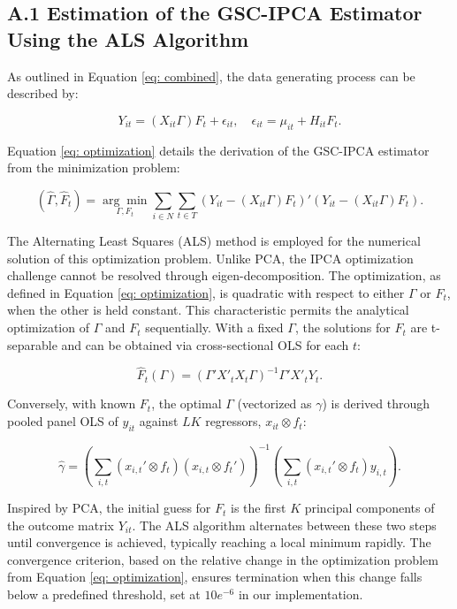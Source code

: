 \documentclass[12pt]{article}
\begin{document}
\subsection*{A.1 Estimation of the GSC-IPCA Estimator Using the ALS Algorithm}

As outlined in Equation \ref{eq: combined}, the data generating process can be described by:

\begin{equation*}
Y_{it} = (X_{it}\Gamma) F_{t} + \epsilon_{it}, \quad \epsilon_{it} = \mu_{it} + H_{it} F_t.
\end{equation*}

Equation \ref{eq: optimization} details the derivation of the GSC-IPCA estimator from the minimization problem:

\begin{equation*}
(\hat{\Gamma}, \hat{F}_t) = \underset{\Gamma, F_t}{\arg\min} \sum_{i \in N} \sum_{t \in T} \left( Y_{it} - (X_{it}\Gamma) F_{t} \right)' \left( Y_{it} - (X_{it}\Gamma) F_{t} \right).
\end{equation*}

The Alternating Least Squares (ALS) method is employed for the numerical solution of this optimization problem. Unlike PCA, the IPCA optimization challenge cannot be resolved through eigen-decomposition. The optimization, as defined in Equation \ref{eq: optimization}, is quadratic with respect to either $\Gamma$ or $F_t$, when the other is held constant. This characteristic permits the analytical optimization of $\Gamma$ and $F_t$ sequentially. With a fixed $\Gamma$, the solutions for $F_t$ are t-separable and can be obtained via cross-sectional OLS for each $t$:

\begin{equation*}
\hat{F}_t(\Gamma) = (\Gamma' X'_t X_t \Gamma)^{-1} \Gamma' X'_t Y_t.
\end{equation*}

Conversely, with known $F_{t}$, the optimal $\Gamma$ (vectorized as $\gamma$) is derived through pooled panel OLS of $y_{it}$ against $LK$ regressors, $x_{it} \otimes f_t$:

\begin{equation*}
\hat{\gamma} = \left( \sum_{i,t} (x_{i,t}' \otimes f_t) (x_{i,t} \otimes f_t') \right)^{-1} \left( \sum_{i,t} (x_{i,t}' \otimes f_t) y_{i,t} \right).
\end{equation*}

Inspired by PCA, the initial guess for $F_t$ is the first $K$ principal components of the outcome matrix $Y_{it}$. The ALS algorithm alternates between these two steps until convergence is achieved, typically reaching a local minimum rapidly. The convergence criterion, based on the relative change in the optimization problem from Equation \ref{eq: optimization}, ensures termination when this change falls below a predefined threshold, set at $10e^{-6}$ in our implementation.
\end{document}
